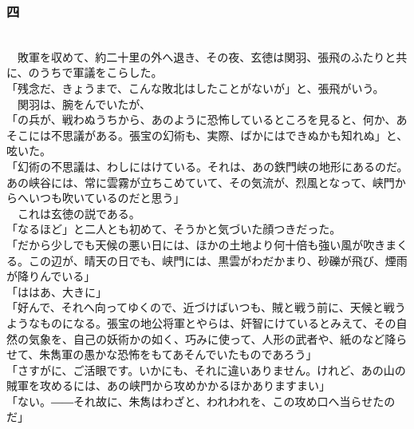 \documentclass[
  paper=a5,
  fontsize=10pt,
  jafontsize=9.5pt,
  tate,                  %
  open_bracket_pos=nibu, %
]{jlreq}
\begin{document}
\subsubsection{四}

\\


　敗軍を収めて、約二十里の外へ退き、その夜、玄徳は関羽、張飛のふたりと共に、のうちで軍議をこらした。\\


「残念だ、きょうまで、こんな敗北はしたことがないが」と、張飛がいう。\\


　関羽は、腕をんでいたが、\\


「の兵が、戦わぬうちから、あのように恐怖しているところを見ると、何か、あそこには不思議がある。張宝の幻術も、実際、ばかにはできぬかも知れぬ」と、呟いた。\\


「幻術の不思議は、わしにはけている。それは、あの鉄門峡の地形にあるのだ。あの峡谷には、常に雲霧が立ちこめていて、その気流が、烈風となって、峡門からへいつも吹いているのだと思う」\\


　これは玄徳の説である。\\


「なるほど」と二人とも初めて、そうかと気づいた顔つきだった。\\


「だから少しでも天候の悪い日には、ほかの土地より何十倍も強い風が吹きまくる。この辺が、晴天の日でも、峡門には、黒雲がわだかまり、砂礫が飛び、煙雨が降りんでいる」\\


「ははあ、大きに」\\


「好んで、それへ向ってゆくので、近づけばいつも、賊と戦う前に、天候と戦うようなものになる。張宝の地公将軍とやらは、奸智にけているとみえて、その自然の気象を、自己の妖術かの如く、巧みに使って、人形の武者や、紙のなど降らせて、朱雋軍の愚かな恐怖をもてあそんでいたものであろう」\\


「さすがに、ご活眼です。いかにも、それに違いありません。けれど、あの山の賊軍を攻めるには、あの峡門から攻めかかるほかありますまい」\\


「ない。――それ故に、朱雋はわざと、われわれを、この攻め口へ当らせたのだ」\\
\end{document}
